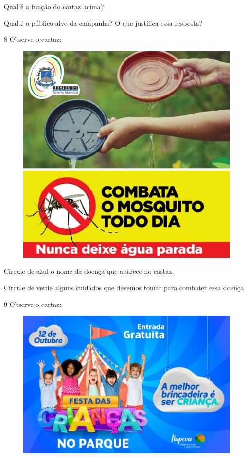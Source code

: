 \begin{escolha}
\item Qual é a função do cartaz acima?\\

\item Qual é o público-alvo da campanha? O que justifica essa resposta?\\
\end{escolha}

\num{8} Observe o cartaz:

\begin{figure}[H]
\centering
\includegraphics[width=.55\textwidth]{media/image134.jpg}
\end{figure}


\begin{escolha}
\item Circule de azul o nome da doença que aparece no cartaz.

\item Circule de verde alguns cuidados que devemos tomar para combater essa doença.
\end{escolha}

\num{9} Observe o cartaz:

\begin{figure}[H]
\centering
\includegraphics[width=.8\textwidth]{media/image135.jpeg}
\end{figure}

